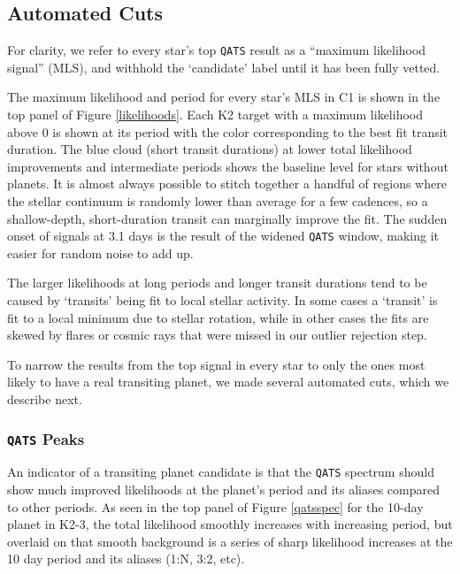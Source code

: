 \documentclass[twocolumn]{aastex62}
\newcommand{\pipeline}[1]{\texttt{#1}}
\begin{document}
\subsection{Automated Cuts}
\label{autovet}

 For clarity, we refer to every star's top \pipeline{QATS} result as a
 ``maximum likelihood signal'' (MLS), and withhold the `candidate'
 label until it has been fully vetted.
    
The maximum likelihood and period for every star's MLS in C1 is shown
in the top panel of Figure \ref{likelihoods}. Each K2 target with a
maximum likelihood above 0 is shown at its period with the color
corresponding to the best fit transit duration. The blue cloud (short
transit durations) at lower total likelihood improvements and
intermediate periods shows the baseline level for stars without
planets. It is almost always possible to stitch together a handful of
regions where the stellar continuum is randomly lower than average for
a few cadences, so a shallow-depth, short-duration transit can
marginally improve the fit. The sudden onset of signals at 3.1 days is
the result of the widened \pipeline{QATS} window, making it easier for
random noise to add up.

The larger likelihoods at long periods and longer transit durations
tend to be caused by `transits' being fit to local stellar
activity. In some cases a `transit' is fit to a local minimum due to
stellar rotation, while in other cases the fits are skewed by flares
or cosmic rays that were missed in our outlier rejection step.

To narrow the results from the top signal in every star to only the
ones most likely to have a real transiting planet, we made several
automated cuts, which we describe next.


\subsubsection{\pipeline{QATS} Peaks}
\label{qatspeaks}

An indicator of a transiting planet candidate is that the
\pipeline{QATS} spectrum should show much improved likelihoods at the
planet's period and its aliases compared to other periods. As seen in
the top panel of Figure \ref{qatsspec} for the 10-day planet in K2-3,
the total likelihood smoothly increases with increasing period, but
overlaid on that smooth background is a series of sharp likelihood
increases at the 10 day period and its aliases (1:N, 3:2, etc).
\end{document}
